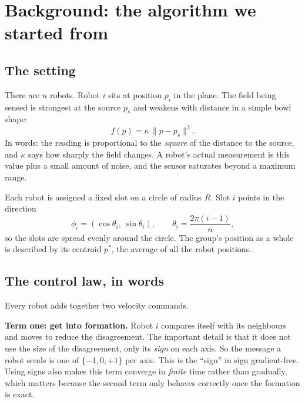 \documentclass[11pt,a4paper]{article}
\begin{document}
\section{Background: the algorithm we started from}

\subsection{The setting}

There are $n$ robots. Robot $i$ sits at position $p_i$ in the plane. The field being sensed is
strongest at the source $p_s$ and weakens with distance in a simple bowl shape:
\begin{equation}\label{eq:field}
    f(p) = \kappa \, \| p - p_s \|^2 .
\end{equation}
In words: the reading is proportional to the \emph{square} of the distance to the source, and
$\kappa$ says how sharply the field changes. A robot's actual measurement is this value plus a small
amount of noise, and the sensor saturates beyond a maximum range.

Each robot is assigned a fixed slot on a circle of radius $R$. Slot $i$ points in the direction
\begin{equation}\label{eq:slots}
    \phi_i = \left( \cos\theta_i,\ \sin\theta_i \right),
    \qquad \theta_i = \frac{2\pi(i-1)}{n},
\end{equation}
so the slots are spread evenly around the circle. The group's position as a whole is described by
its centroid $p^*$, the average of all the robot positions.

\subsection{The control law, in words}

Every robot adds together two velocity commands.

\textbf{Term one: get into formation.} Robot $i$ compares itself with its neighbours and moves to
reduce the disagreement. The important detail is that it does not use the size of the disagreement,
only its \emph{sign} on each axis. So the message a robot sends is one of $\{-1, 0, +1\}$ per axis.
This is the ``sign'' in sign gradient-free. Using signs also makes this term converge in
\emph{finite} time rather than gradually, which matters because the second term only behaves
correctly once the formation is exact.
\end{document}
